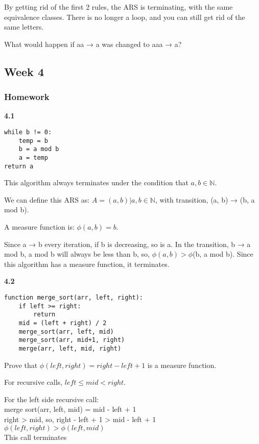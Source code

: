 \documentclass{article}
\theoremstyle{theorem}
\theoremstyle{definition}
\theoremstyle{remark}
\begin{document}
By getting rid of the first 2 rules, the ARS is terminating, with the same equivalence classes. There is no longer a loop, and you can still get rid of the same letters.

What would happen if aa → a was changed to aaa → a?

\subsection{Week 4}

\subsubsection{Homework}

\textbf{4.1}

\begin{verbatim}
while b != 0:
    temp = b
    b = a mod b
    a = temp
return a
\end{verbatim}

This algorithm always terminates under the condition that $a,b \in \mathbb {N}$.

We can define this ARS as: $A = {(a, b) |a,b \in \mathbb {N}}$, with transition, (a, b) → (b, a mod b).

A measure function is: $\phi(a,b) = b$.

Since a → b every iteration, if b is decreasing, so is a. In the transition, b → a mod b, a mod b will always be less than b, so, $\phi(a, b) > \phi$(b, a mod b). Since this algorithm has a measure function, it terminates.

\textbf{4.2}

\begin{verbatim}
function merge_sort(arr, left, right):
    if left >= right:
        return
    mid = (left + right) / 2
    merge_sort(arr, left, mid)
    merge_sort(arr, mid+1, right)
    merge(arr, left, mid, right)
\end{verbatim}

Prove that $\phi(left, right) = right - left + 1$ is a measure function.

For recursive calls, $left \le mid < right$.

For the left side recursive call:\\
merge sort(arr, left, mid) = mid - left + 1\\
right > mid, so, right - left + 1 > mid - left + 1\\
$\phi(left, right) > \phi(left, mid)$\\
This call terminates
\end{document}
